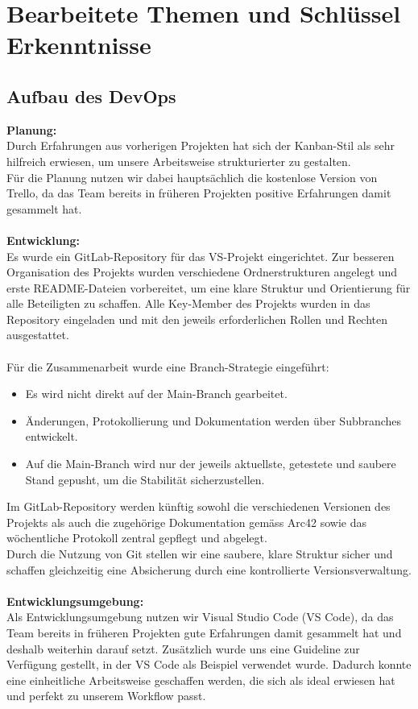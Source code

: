 \documentclass{article}
\begin{document}
\section{Bearbeitete Themen und Schlüssel Erkenntnisse}
\subsection{Aufbau des DevOps}
\textbf{Planung:}\\
Durch Erfahrungen aus vorherigen Projekten hat sich der Kanban-Stil als sehr hilfreich erwiesen, um unsere Arbeitsweise strukturierter zu gestalten.\\
Für die Planung nutzen wir dabei hauptsächlich die kostenlose Version von Trello, da das Team bereits in früheren Projekten positive Erfahrungen damit gesammelt hat.\\\\
\textbf{Entwicklung:}\\
Es wurde ein GitLab-Repository für das VS-Projekt eingerichtet.
Zur besseren Organisation des Projekts wurden verschiedene Ordnerstrukturen angelegt und erste README-Dateien vorbereitet, um eine klare Struktur und Orientierung für alle Beteiligten zu schaffen.
Alle Key-Member des Projekts wurden in das Repository eingeladen und mit den jeweils erforderlichen Rollen und Rechten ausgestattet.\\\\
Für die Zusammenarbeit wurde eine Branch-Strategie eingeführt:

\begin{itemize}
	\item Es wird nicht direkt auf der Main-Branch gearbeitet.
	\item  Änderungen, Protokollierung und Dokumentation werden über Subbranches entwickelt.
	\item Auf die Main-Branch wird nur der jeweils aktuellste, getestete und saubere Stand gepusht, um die Stabilität sicherzustellen.
\end{itemize}
Im GitLab-Repository werden künftig sowohl die verschiedenen Versionen des Projekts als auch die zugehörige Dokumentation gemäss Arc42 sowie das wöchentliche Protokoll zentral gepflegt und abgelegt.\\
Durch die Nutzung von Git stellen wir eine saubere, klare Struktur sicher und schaffen gleichzeitig eine Absicherung durch eine kontrollierte Versionsverwaltung.\\\\ 
\textbf{Entwicklungsumgebung:}\\
Als Entwicklungsumgebung nutzen wir Visual Studio Code (VS Code), da das Team bereits in früheren Projekten gute Erfahrungen damit gesammelt hat und deshalb weiterhin darauf setzt.
Zusätzlich wurde uns eine Guideline zur Verfügung gestellt, in der VS Code als Beispiel verwendet wurde. Dadurch konnte eine einheitliche Arbeitsweise geschaffen werden, die sich als ideal erwiesen hat und perfekt zu unserem Workflow passt.
\end{document}
